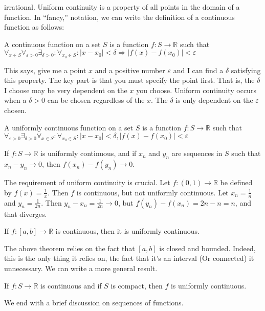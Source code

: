 \documentclass[crop=false,class=article,oneside]{standalone}
\begin{document}
            irrational. Uniform continuity is a property of
            all points in the domain of a function. In
            ``fancy,'' notation, we can write the definition
            of a continuous function as follows:
            \begin{definition}
                A continuous function on a set $S$ is a
                function $f:S\rightarrow\mathbb{R}$ such that
                $\forall_{x\in{S}}\forall_{\varepsilon>0}%
                 \exists_{\delta>0}:\forall_{x_{0}\in{S}}:%
                 |x-x_{0}|<\delta%
                 \Rightarrow|f(x)-f(x_{0})|<\varepsilon$
            \end{definition}
            This says, give me a point $x$
            and a positive number
            $\varepsilon$ and I can find a $\delta$ satisfying
            this property. The key part is that you must
            specify the point first. That is, the $\delta$ I
            choose may be very dependent on the $x$ you choose.
            Uniform continuity occurs when a $\delta>0$ can be
            chosen regardless of the $x$. The $\delta$ is
            only dependent on the $\varepsilon$ chosen.
            \begin{definition}
                A uniformly continuous function on a set $S$
                is a function $f:S\rightarrow\mathbb{R}$ such that
                $\forall_{\varepsilon>0}\exists_{\delta>0}%
                 \forall_{x\in{S}}:\forall_{x_{0}\in{S}}:%
                 |x-x_{0}|<\delta,|f(x)-f(x_{0})|<\varepsilon$
            \end{definition}
            \begin{theorem}
                If $f:S\rightarrow\mathbb{R}$ is uniformly
                continuous, and if $x_{n}$ and $y_{n}$
                are sequences in $S$ such that
                $x_{n}-y_{n}\rightarrow{0}$, then
                $f(x_{n})-f(y_{n})\rightarrow{0}$.
            \end{theorem}
            The requirement of uniform continuity is crucial.
            Let $f:(0,1)\rightarrow\mathbb{R}$ be defined by
            $f(x)=\frac{1}{x}$. Then $f$ is continuous, but
            not uniformly continuous. Let $x_{n}=\frac{1}{n}$
            and $y_{n}=\frac{1}{2n}$. Then
            $y_{n}-x_{n}=\frac{1}{2n}\rightarrow{0}$, but
            $f(y_{n})-f(x_{n})=2n-n=n$, and that diverges.
            \begin{theorem}
                If $f:[a,b]\rightarrow\mathbb{R}$ is
                continuous, then it is uniformly continuous.
            \end{theorem}
            The above theorem relies on the fact that
            $[a,b]$ is closed and bounded. Indeed, this is
            the only thing it relies on, the fact that it's
            an interval (Or connected) it unnecessary. We can
            write a more general result.
            \begin{theorem}
                If $f:S\rightarrow\mathbb{R}$ is continuous
                and if $S$ is compact, then $f$ is
                uniformly continuous.
            \end{theorem}
            We end with a brief discussion on sequences of
            functions.
\end{document}
